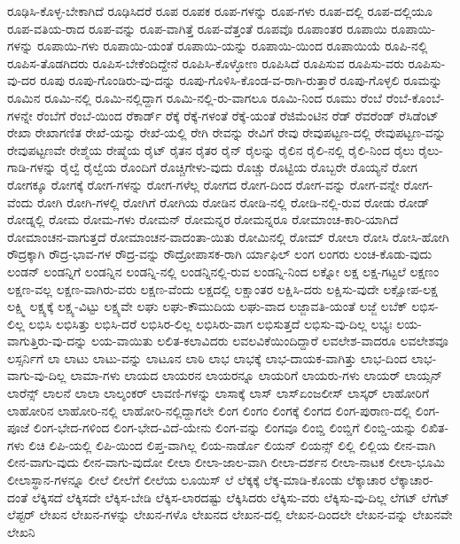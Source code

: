 {ರೂಢಿಸಿ-ಕೊಳ್ಳ-ಬೇಕಾಗಿದೆ
ರೂಢಿಸಿದರೆ
ರೂಪ
ರೂಪಕ
ರೂಪ-ಗಳನ್ನು
ರೂಪ-ಗಳು
ರೂಪ-ದಲ್ಲಿ
ರೂಪ-ದಲ್ಲಿಯೂ
ರೂಪ-ವತಿಯ-ರಾದ
ರೂಪ-ವನ್ನು
ರೂಪ-ವಾಗಿತ್ತೆ
ರೂಪ-ವೆತ್ತಂತೆ
ರೂಪವೊ
ರೂಪಾಂತರ
ರೂಪಾಯಿ
ರೂಪಾಯಿ-ಗಳನ್ನು
ರೂಪಾಯಿ-ಗಳು
ರೂಪಾಯಿ-ಯಂತೆ
ರೂಪಾಯಿ-ಯನ್ನು
ರೂಪಾಯಿ-ಯಿಂದ
ರೂಪಾಯಿಯೆ
ರೂಪಿ-ನಲ್ಲಿ
ರೂಪಿಸ-ತೊಡಗಿದರು
ರೂಪಿಸ-ಬೇಕೆಂದಿದ್ದೇನೆ
ರೂಪಿಸಿ-ಕೊಳ್ಳೋಣ
ರೂಪಿಸಿದೆ
ರೂಪಿಸುವ
ರೂಪಿಸು-ವರು
ರೂಪಿಸು-ವು-ದರ
ರೂಪು
ರೂಪು-ಗೊಂಡಿರು-ವು-ದನ್ನು
ರೂಪು-ಗೊಳಿಸಿ-ಕೊಂಡ-ವ-ರಾಗಿ-ರುತ್ತಾರೆ
ರೂಪು-ಗೊಳ್ಳಲಿ
ರೂಮನ್ನು
ರೂಮಿನ
ರೂಮಿ-ನಲ್ಲಿ
ರೂಮಿ-ನಲ್ಲಿದ್ದಾಗ
ರೂಮಿ-ನಲ್ಲಿ-ರು-ವಾಗಲೂ
ರೂಮಿ-ನಿಂದ
ರೂಮು
ರೆಂಬೆ
ರೆಂಬೆ-ಕೊಂಬೆ-ಗಳನ್ನೇ
ರೆಂಬೆಗೆ
ರೆಂಬೆ-ಯಿಂದ
ರೆಕಾರ್ಡ್
ರೆಕ್ಕೆ
ರೆಕ್ಕೆ-ಗಳಂತೆ
ರೆಕ್ಕೆ-ಯಂತೆ
ರೆಜಿಮೆಂಟಿನ
ರೆಡ್
ರೆವರೆಂಡ್
ರೆಸಿಡೆಂಟ್
ರೇಖಾ
ರೇಖಾಗಣಿತ
ರೇಖೆ-ಯನ್ನು
ರೇಖೆ-ಯಲ್ಲಿ
ರೇಗಿ
ರೇವನ್ನು
ರೇವಿಗೆ
ರೇವು
ರೇವುಪಟ್ಟಣ-ದಲ್ಲಿ
ರೇವುಪಟ್ಟಣ-ವನ್ನು
ರೇವುಪಟ್ಟಣವೇ
ರೇಶ್ಮೆಯ
ರೇಷ್ಮೆಯ
ರೈಟ್
ರೈತನ
ರೈತರ
ರೈನ್
ರೈಲನ್ನು
ರೈಲಿನ
ರೈಲಿ-ನಲ್ಲಿ
ರೈಲಿ-ನಿಂದ
ರೈಲು
ರೈಲು-ಗಾಡಿ-ಗಳನ್ನು
ರೈಲ್ವೆ
ರೈಲ್ವೆಯ
ರೊಂದಿಗೆ
ರೊಚ್ಚಿಗೇಳು-ವುದು
ರೊಚ್ಚು
ರೊಟ್ಟಿಯ
ರೊಬ್ಬರೇ
ರೊಯ್ಯನೆ
ರೋಗ
ರೋಗಕ್ಕೂ
ರೋಗಕ್ಕೆ
ರೋಗ-ಗಳನ್ನು
ರೋಗ-ಗಳೆಲ್ಲ
ರೋಗದ
ರೋಗ-ದಿಂದ
ರೋಗ-ವನ್ನು
ರೋಗ-ವನ್ನೇ
ರೋಗ-ವೆಂದು
ರೋಗಿ
ರೋಗಿ-ಗಳಲ್ಲಿ
ರೋಗಿಗೆ
ರೋಗಿಯ
ರೋಡಿನ
ರೋಡಿ-ನಲ್ಲಿ
ರೋಡಿ-ನಲ್ಲಿ-ರುವ
ರೋಡು
ರೋಡ್
ರೋಡ್ನಲ್ಲಿ
ರೋಮ
ರೋಮ-ಗಳು
ರೋಮನ್
ರೋಮನ್ನರ
ರೋಮನ್ನರೂ
ರೋಮಾಂಚ-ಕಾರಿ-ಯಾಗಿದೆ
ರೋಮಾಂಚನ-ವಾಗುತ್ತದೆ
ರೋಮಾಂಚನ-ವಾದಂತಾ-ಯಿತು
ರೋಮಿನಲ್ಲಿ
ರೋಮ್
ರೋಲಾ
ರೋಸಿ
ರೋಸಿ-ಹೋಗಿ
ರೌದ್ರಕ್ಕಾಗಿ
ರೌದ್ರ-ಭಾವ-ಗಳ
ರೌದ್ರ-ವನ್ನು
ರೌದ್ರೋಪಾಸಕ-ರಾಗಿ
ರ್ಯಾಫಿಲ್
ಲಂಗ
ಲಂಗರು
ಲಂಚ-ಕೊಡು-ವುದು
ಲಂಡನ್
ಲಂಡನ್ನಿಗೆ
ಲಂಡನ್ನಿನ
ಲಂಡನ್ನಿ-ನಲ್ಲಿ
ಲಂಡನ್ನಿನಲ್ಲಿ-ರುವ
ಲಂಡನ್ನಿ-ನಿಂದ
ಲಕ್ನೋ
ಲಕ್ಷ
ಲಕ್ಷ-ಗಟ್ಟಲೆ
ಲಕ್ಷಣಂ
ಲಕ್ಷಣ-ವಲ್ಲ
ಲಕ್ಷಣ-ವಾಗಿರು-ವರು
ಲಕ್ಷಣ-ವೆಂದು
ಲಕ್ಷದಲ್ಲಿ
ಲಕ್ಷಾಂತರ
ಲಕ್ಷಿಸಿ-ದರು
ಲಕ್ಷಿಸು-ವುದೇ
ಲಕ್ಷೋಪ-ಲಕ್ಷ
ಲಕ್ಷ್ಮಿ
ಲಕ್ಷ್ಯಕ್ಕೆ
ಲಕ್ಷ್ಯ-ವಿಟ್ಟು
ಲಕ್ಷ್ಯವೇ
ಲಘು
ಲಘು-ಕೌಮುದಿಯ
ಲಘು-ವಾದ
ಲಜ್ಜಾವತಿ-ಯಂತೆ
ಲಜ್ಜೆ
ಲಬೆಕ್
ಲಭಿಸ-ಲಿಲ್ಲ
ಲಭಿಸಿ
ಲಭಿಸಿತ್ತು
ಲಭಿಸಿ-ದರೆ
ಲಭಿಸಿರ-ಲಿಲ್ಲ
ಲಭಿಸಿರು-ವಾಗ
ಲಭಿಸುತ್ತದೆ
ಲಭಿಸು-ವು-ದಿಲ್ಲ
ಲಭ್ಯಃ
ಲಯ-ವಾಗುತ್ತಿರು-ವು-ದನ್ನು
ಲಯ-ವಾಯಿತು
ಲಲಿತ-ಕಲಾವಿದರು
ಲವಲವಿಕೆಯಿಂದಿದ್ದಾರೆ
ಲವಲೇಶ-ವಾದರೂ
ಲವಲೇಶವೂ
ಲಸ್ಸರ್ನಿಗೆ
ಲಾ
ಲಾಟು
ಲಾಟು-ವನ್ನು
ಲಾಟೂನ
ಲಾಠಿ
ಲಾಭ
ಲಾಭಕ್ಕೆ
ಲಾಭ-ದಾಯಕ-ವಾಗಿತ್ತು
ಲಾಭ-ದಿಂದ
ಲಾಭ-ವಾಗು-ವು-ದಿಲ್ಲ
ಲಾಮಾ-ಗಳು
ಲಾಯದ
ಲಾಯರನ
ಲಾಯರನ್ನೂ
ಲಾಯರಿಗೆ
ಲಾಯರು-ಗಳು
ಲಾಯರ್
ಲಾಯ್ಸನ್
ಲಾರೆನ್ಸ್
ಲಾಲನೆ
ಲಾಲಾ
ಲಾಲ್ಶಂಕರ್
ಲಾವಣಿ-ಗಳನ್ನು
ಲಾಸಾಕ್ಕೆ
ಲಾಸ್
ಲಾಸ್ಏಂಜಲೀಸ್
ಲಾಸ್ಕರ್
ಲಾಹೋರಿಗೆ
ಲಾಹೋರಿನ
ಲಾಹೋರಿ-ನಲ್ಲಿ
ಲಾಹೋರಿ-ನಲ್ಲಿದ್ದಾಗಲೇ
ಲಿಂಗ
ಲಿಂಗಂ
ಲಿಂಗಕ್ಕೆ
ಲಿಂಗದ
ಲಿಂಗ-ಪುರಾಣ-ದಲ್ಲಿ
ಲಿಂಗ-ಪೂಜೆ
ಲಿಂಗ-ಭೇದ-ಗಳಿಂದ
ಲಿಂಗ-ಭೇದ-ವಿದೆ-ಯೇನು
ಲಿಂಗ-ವನ್ನು
ಲಿಂಗವೂ
ಲಿಂಬ್ಡಿ
ಲಿಂಬ್ಡಿಗೆ
ಲಿಂಬ್ಡಿ-ಯನ್ನು
ಲಿಖಿತ-ಗಳು
ಲಿಚಿ
ಲಿಪಿ-ಯಲ್ಲಿ
ಲಿಪಿ-ಯಿಂದ
ಲಿಪ್ತ-ವಾಗಿಲ್ಲ
ಲಿಯ-ನಾರ್ಡೊ
ಲಿಯನ್
ಲಿಯನ್ಸ್
ಲಿಲ್ಲಿ
ಲಿಲ್ಲಿಯ
ಲೀನ-ವಾಗಿ
ಲೀನ-ವಾಗು-ವುದು
ಲೀನ-ವಾಗು-ವುದೋ
ಲೀಲಾ
ಲೀಲಾ-ಜಾಲ-ವಾಗಿ
ಲೀಲಾ-ದರ್ಶನ
ಲೀಲಾ-ನಾಟಕ
ಲೀಲಾ-ಭೂಮಿ
ಲೀಲಾಸ್ಥಾನ-ಗಳನ್ನೂ
ಲೀಲೆ
ಲೀಲೆಗೆ
ಲೀಲೆಯ
ಲೂಯಿಸ್
ಲೆ
ಲೆಕ್ಕಕ್ಕೆ
ಲೆಕ್ಕ-ಮಾಡಿ-ಕೊಂಡು
ಲೆಕ್ಕಾಚಾರ
ಲೆಕ್ಕಾಚಾರ-ದಂತೆ
ಲೆಕ್ಕಿಸದೆ
ಲೆಕ್ಕಿಸದೇ
ಲೆಕ್ಕಿಸ-ಬೇಡಿ
ಲೆಕ್ಕಿಸ-ಲಾರದಷ್ಟು
ಲೆಕ್ಕಿಸಿದರು
ಲೆಕ್ಕಿಸು-ವರು
ಲೆಕ್ಕಿಸು-ವು-ದಿಲ್ಲ
ಲೆಗಟ್
ಲೆಗೆಟ್
ಲೆಪ್ಟರ್
ಲೇಖನ
ಲೇಖನ-ಗಳನ್ನು
ಲೇಖನ-ಗಳೊ
ಲೇಖನದ
ಲೇಖನ-ದಲ್ಲಿ
ಲೇಖನ-ದಿಂದಲೇ
ಲೇಖನ-ವನ್ನು
ಲೇಖನವೇ
ಲೇಖನಿ
}
